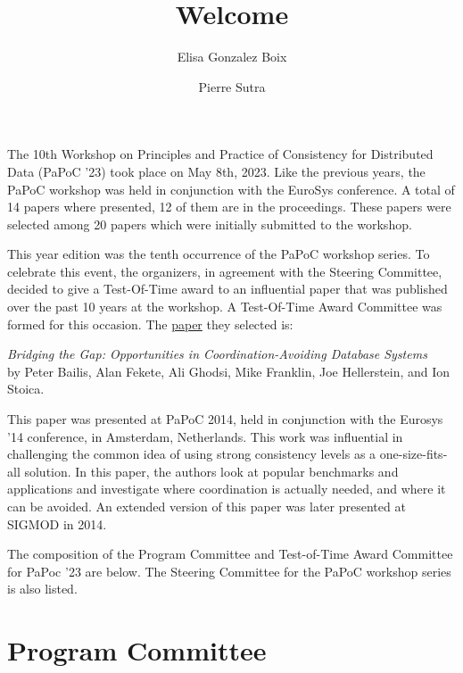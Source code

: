 \documentclass[acmlarge,nonacm]{acmart}
\newenvironment{RCText}[1][2em]
               {\begin{quoting}[leftmargin=#1,rightmargin=.5cm]\RaggedRight}
               {\end{quoting}}
\begin{document}
\title{Welcome}
\author{Elisa Gonzalez Boix}
\author{Pierre Sutra}
\authorsaddresses{}
\renewcommand{\shortauthors}{}
\maketitle

The 10th Workshop on Principles and Practice of Consistency for Distributed Data (PaPoC '23) took place on May 8th, 2023.
Like the previous years, the PaPoC workshop was held in conjunction with the EuroSys conference.
A total of 14 papers where presented, 12 of them are in the proceedings.
These papers were selected among 20 papers which were initially submitted to the workshop.

This year edition was the tenth occurrence of the PaPoC workshop series.
To celebrate this event, the organizers, in agreement with the Steering Committee, decided to give a Test-Of-Time award to an influential paper that was published over the past 10 years at the workshop.
A Test-Of-Time Award Committee was formed for this occasion.
The \href{http://www.bailis.org/blog/bridging-the-gap-opportunities-in-coordination-avoiding-databases/}{paper} they selected is:

\medskip

\begin{RCText}[2cm]
  \textit{Bridging the Gap: Opportunities in Coordination-Avoiding Database Systems} \\
  by Peter Bailis, Alan Fekete, Ali Ghodsi, Mike Franklin, Joe Hellerstein, and Ion Stoica.
\end{RCText}

\medskip

This paper was presented at PaPoC 2014, held in conjunction with the Eurosys '14 conference, in Amsterdam, Netherlands.
This work was influential in challenging the common idea of using strong consistency levels as a one-size-fits-all solution.
In this paper, the authors look at popular benchmarks and applications and investigate where coordination is actually needed, and where it can be avoided.
An extended version of this paper was later presented at SIGMOD in 2014.

The composition of the Program Committee and Test-of-Time Award Committee for PaPoc '23 are below.
The Steering Committee for the PaPoC workshop series is also listed.

\section*{Program Committee}
\end{document}
